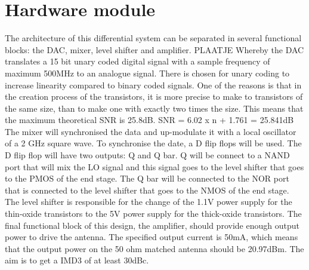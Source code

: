 \section{Hardware module}\label{sec:overview}
The architecture of this differential system can be separated in several functional blocks: the DAC, mixer, level shifter and amplifier.
PLAATJE
Whereby the DAC translates a 15 bit unary coded digital signal with a sample frequency of maximum 500MHz to an analogue signal. There is chosen for unary coding to increase linearity compared to binary coded signals. One of the reasons is that in the creation process of the transistors, it is more precise to make to transistors of the same size, than to make one with exactly two times the size. This means that the maximum theoretical SNR is 25.8dB.
SNR = 6.02 x n + 1.761 = 25.841dB 
The mixer will synchronised the data and up-modulate it with a local oscillator of a 2 GHz square wave. To synchronise the date, a D flip flops will be used. The D flip flop will have two outputs: Q and Q bar. Q will be connect to a NAND port that will mix the LO signal and this signal goes to the level shifter that goes to the PMOS of the end stage.  The Q bar will be connected to the NOR port that is connected to the level shifter that goes to the NMOS of the end stage.
The level shifter is responsible for the change of the 1.1V power supply for the thin-oxide transistors to the 5V power supply for the thick-oxide transistors.
The final functional block of this design, the amplifier, should provide enough output power to drive the antenna. The specified output current is 50mA, which means that the output power on the 50 ohm matched antenna should be 20.97dBm. The aim is to get a IMD3 of at least 30dBc.

